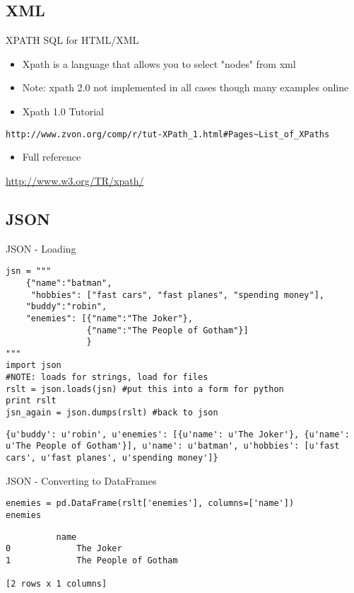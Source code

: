 \documentclass[presentation]{beamer}
\begin{document}
\subsection{XML}
\label{sec-5-2}
\begin{frame}[fragile,label=sec-5-2-1]{XPATH SQL for HTML/XML}
 \begin{itemize}
\item Xpath is a language that allows you to select "nodes" from xml
\item Note: xpath 2.0 not implemented in all cases though many examples online
\item Xpath 1.0 Tutorial
\end{itemize}
\begin{verbatim}
http://www.zvon.org/comp/r/tut-XPath_1.html#Pages~List_of_XPaths
\end{verbatim}
\begin{itemize}
\item Full reference
\end{itemize}
\url{http://www.w3.org/TR/xpath/} 
\end{frame}


\subsection{JSON}
\label{sec-5-3}

\begin{frame}[fragile,label=sec-5-3-1]{JSON - Loading}
 \lstset{numbers=left,language=Python,label= ,caption= }
\begin{lstlisting}
jsn = """
    {"name":"batman",
     "hobbies": ["fast cars", "fast planes", "spending money"],
    "buddy":"robin",
    "enemies": [{"name":"The Joker"},
                {"name":"The People of Gotham"}]
                }
"""
import json
#NOTE: loads for strings, load for files
rslt = json.loads(jsn) #put this into a form for python
print rslt
jsn_again = json.dumps(rslt) #back to json
\end{lstlisting}

\lstset{numbers=left,language=Python,label= ,caption= }
\begin{lstlisting}
{u'buddy': u'robin', u'enemies': [{u'name': u'The Joker'}, {u'name': u'The People of Gotham'}], u'name': u'batman', u'hobbies': [u'fast cars', u'fast planes', u'spending money']}
\end{lstlisting}
\end{frame}


\begin{frame}[fragile,label=sec-5-3-2]{JSON - Converting to DataFrames}
 \lstset{numbers=left,language=Python,label= ,caption= }
\begin{lstlisting}
enemies = pd.DataFrame(rslt['enemies'], columns=['name'])
enemies
\end{lstlisting}

\lstset{numbers=left,language=Python,label= ,caption= }
\begin{lstlisting}
	      name
0             The Joker
1             The People of Gotham

[2 rows x 1 columns]
\end{lstlisting}
\end{frame}
\end{document}
